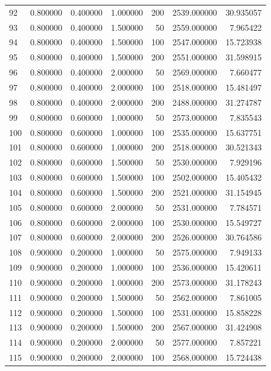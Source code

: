 \begin{longtable}{lrrrrrr}
92 & 0.800000 & 0.400000 & 1.000000 & 200 & 2539.000000 & 30.935057 \\
93 & 0.800000 & 0.400000 & 1.500000 & 50 & 2559.000000 & 7.965422 \\
94 & 0.800000 & 0.400000 & 1.500000 & 100 & 2547.000000 & 15.723938 \\
95 & 0.800000 & 0.400000 & 1.500000 & 200 & 2551.000000 & 31.598915 \\
96 & 0.800000 & 0.400000 & 2.000000 & 50 & 2569.000000 & 7.660477 \\
97 & 0.800000 & 0.400000 & 2.000000 & 100 & 2518.000000 & 15.481497 \\
98 & 0.800000 & 0.400000 & 2.000000 & 200 & 2488.000000 & 31.274787 \\
99 & 0.800000 & 0.600000 & 1.000000 & 50 & 2573.000000 & 7.835543 \\
100 & 0.800000 & 0.600000 & 1.000000 & 100 & 2535.000000 & 15.637751 \\
101 & 0.800000 & 0.600000 & 1.000000 & 200 & 2518.000000 & 30.521343 \\
102 & 0.800000 & 0.600000 & 1.500000 & 50 & 2530.000000 & 7.929196 \\
103 & 0.800000 & 0.600000 & 1.500000 & 100 & 2502.000000 & 15.405432 \\
104 & 0.800000 & 0.600000 & 1.500000 & 200 & 2521.000000 & 31.154945 \\
105 & 0.800000 & 0.600000 & 2.000000 & 50 & 2531.000000 & 7.784571 \\
106 & 0.800000 & 0.600000 & 2.000000 & 100 & 2530.000000 & 15.549727 \\
107 & 0.800000 & 0.600000 & 2.000000 & 200 & 2526.000000 & 30.764586 \\
108 & 0.900000 & 0.200000 & 1.000000 & 50 & 2575.000000 & 7.949133 \\
109 & 0.900000 & 0.200000 & 1.000000 & 100 & 2536.000000 & 15.420611 \\
110 & 0.900000 & 0.200000 & 1.000000 & 200 & 2573.000000 & 31.178243 \\
111 & 0.900000 & 0.200000 & 1.500000 & 50 & 2562.000000 & 7.861005 \\
112 & 0.900000 & 0.200000 & 1.500000 & 100 & 2531.000000 & 15.858228 \\
113 & 0.900000 & 0.200000 & 1.500000 & 200 & 2567.000000 & 31.424908 \\
114 & 0.900000 & 0.200000 & 2.000000 & 50 & 2577.000000 & 7.857221 \\
115 & 0.900000 & 0.200000 & 2.000000 & 100 & 2568.000000 & 15.724438 \\

\end{longtable}
